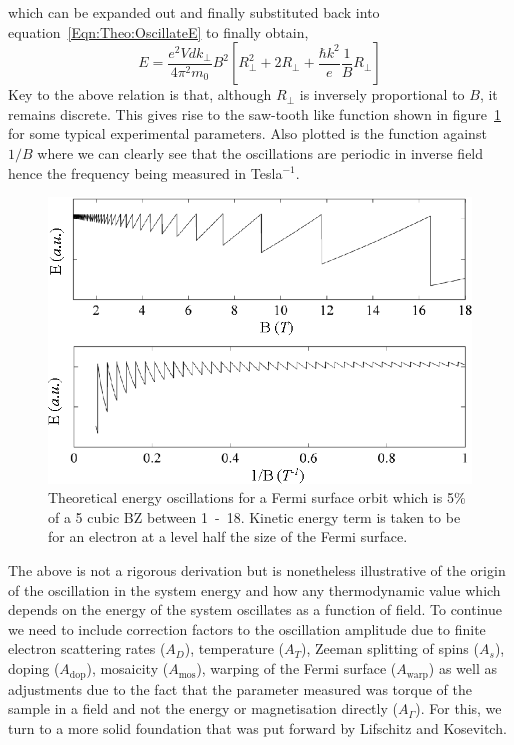 which can be expanded out and finally substituted back into equation~\ref{Eqn:Theo:OscillateE} to finally obtain,
\begin{equation}
\label{Eqn:Theo:OscIllustration}
E = \frac{e^2Vdk_\perp}{4\pi^2m_0}B^2\left[R_\perp^2 + 2R_\perp + \frac{\hbar k^2}{e}\frac{1}{B}R_\perp\right]
\end{equation}
Key to the above relation is that, although $R_\perp$ is inversely proportional to $B$, it remains discrete. This gives rise to the saw-tooth like function shown in figure~\ref{Fig:Theo:EnergyOscillations} for some typical experimental parameters. Also plotted is the function against $1/B$ where we can clearly see that the oscillations are periodic in inverse field hence the frequency being measured in Tesla$^{-1}$.
\begin{figure}[htbp]
    \begin{center}
        \includegraphics[scale=0.9]{Chapter-Theory/Figures/TheoreticalOscillations/TheoreticalOscillations}
        \caption{Theoretical energy oscillations for a Fermi surface orbit which is 5\% of a \unit{5}{\angstrom} cubic \ac{BZ} between \unit{1-18}{\tesla}. Kinetic energy term is taken to be for an electron at a level half the size of the Fermi surface.}
        \label{Fig:Theo:EnergyOscillations}
    \end{center}
\end{figure}

The above is not a rigorous derivation but is nonetheless illustrative of the origin of the oscillation in the system energy and how any thermodynamic value which depends on the energy of the system oscillates as a function of field. To continue we need to include correction factors to the oscillation amplitude due to finite electron scattering rates ($A_D$), temperature ($A_T$), Zeeman splitting of spins ($A_s$), doping ($A_{\textrm{dop}}$), mosaicity ($A_{\textrm{mos}}$), warping of the Fermi surface ($A_{\textrm{warp}}$) as well as adjustments due to the fact that the parameter measured was torque of the sample in a field and not the energy or magnetisation directly ($A_{\Gamma}$). For this, we turn to a more solid foundation that was put forward by Lifschitz and Kosevitch.

